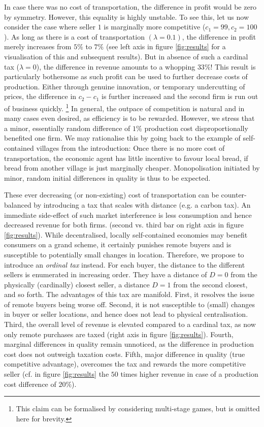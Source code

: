 \documentclass[final,5p,times,twocolumn,11pt,authoryear]{elsarticle}
\numberwithin{equation}{section} %
\begin{document}
In case there was no cost of transportation, the difference in profit would be zero by symmetry. 
However, this equality is highly unstable. 
To see this, let us now consider the case where seller $1$ is marginally more competitive ($c_1 = 99, c_2 =100$). 
As long as there is a cost of transportation $(\lambda=0.1)$, the difference in profit merely increases from $5\%$ to $7\%$ (see left axis in figure \ref{fig:results} for a visualisation of this and subsequent results).
But in absence of such a cardinal tax ($\lambda=0$), the difference in revenue amounts to a whopping $33\%$!
This result is particularly bothersome as such profit can be used to further decrease costs of production. 
Either through genuine innovation, or temporary undercutting of prices, the difference in $c_2 - c_1$ is further increased and the second firm is run out of business quickly. 
\footnote{
This claim can be formalised by considering multi-stage games, but is omitted here for brevity.
} 
In general, the outpace of competition is natural and in many cases even desired, as efficiency is to be rewarded. 
However, we stress that a minor, essentially random difference of $1\%$ production cost disproportionally benefited one firm. 
We may rationalise this by going back to the example of self-contained villages from the introduction: 
Once there is no more cost of transportation, the economic agent has little incentive to favour local bread, if bread from another village is just marginally cheaper. 
Monopolisation initiated by minor, random initial differences in quality is thus to be expected. 

These ever decreasing (or non-existing) cost of transportation can be counter-balanced by introducing a tax that scales with distance (e.g. a carbon tax). 
An immediate side-effect of such market interference is less consumption and hence decreased revenue for both firms. (second vs. third bar on right axis in figure \ref{fig:results}). 
While decentralised, locally self-contained economies may benefit consumers on a grand scheme, it certainly punishes remote buyers and is susceptible to potentially small changes in location. 
Therefore, we propose to introduce an \textit{ordinal tax} instead. 
For each buyer, the distance to the different sellers is enumerated in increasing order. 
They have a distance of $D=0$ from the physically (cardinally) closest seller, a distance $D=1$ from the second closest, and so forth. 
The advantages of this tax are manifold. 
First, it resolves the issue of remote buyers being worse off. 
Second, it is not susceptible to (small) changes in buyer or seller locations, and hence does not lead to physical centralisation. 
Third, the overall level of revenue is elevated compared to a cardinal tax, as now only remote purchases are taxed (right axis in figure \ref{fig:results}). 
Fourth, marginal differences in quality remain unnoticed, as the difference in production cost does not outweigh taxation costs. 
Fifth, major difference in quality (true competitive advantage), overcomes the tax and rewards the more competitive seller 
(cf. in figure \ref{fig:results} the $50$ times higher revenue in case of a production cost difference of $20\%$). 
\end{document}
